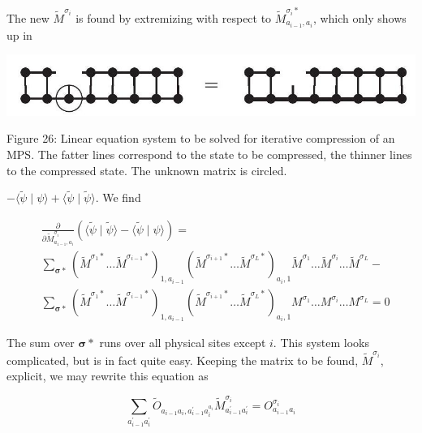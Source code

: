 \documentclass[12pt]{article}
\begin{document}
The new $\tilde{M}^{\sigma_{i}}$ is found by extremizing with respect to $\tilde{M}_{a_{i-1}, a_{i}}^{\sigma_{i} *}$, which only shows up in

\begin{center}
\includegraphics[max width=\textwidth]{2024_05_04_afc4ad226da9ccfe0ac8g-047}
\end{center}

Figure 26: Linear equation system to be solved for iterative compression of an MPS. The fatter lines correspond to the state to be compressed, the thinner lines to the compressed state. The unknown matrix is circled.

$-\langle\tilde{\psi} \mid \psi\rangle+\langle\tilde{\psi} \mid \tilde{\psi}\rangle$. We find

$$
\begin{aligned}
& \frac{\partial}{\partial \tilde{M}_{a_{1-1}, a_{i}}^{\sigma_{i}}}(\langle\tilde{\psi} \mid \tilde{\psi}\rangle-\langle\tilde{\psi} \mid \psi\rangle)= \\
& \sum_{\boldsymbol{\sigma} *}\left(\tilde{M}^{\sigma_{1} *} \ldots \tilde{M}^{\sigma_{i-1} *}\right)_{1, a_{i-1}}\left(\tilde{M}^{\sigma_{i+1} *} \ldots \tilde{M}^{\sigma_{L} *}\right)_{a_{i}, 1} \tilde{M}^{\sigma_{1}} \ldots \tilde{M}^{\sigma_{i}} \ldots \tilde{M}^{\sigma_{L}}- \\
& \sum_{\boldsymbol{\sigma} *}\left(\tilde{M}^{\sigma_{1} *} \ldots \tilde{M}^{\sigma_{i-1} *}\right)_{1, a_{i-1}}\left(\tilde{M}^{\sigma_{i+1} *} \ldots \tilde{M}^{\sigma_{L} *}\right)_{a_{i}, 1} M^{\sigma_{1}} \ldots M^{\sigma_{i}} \ldots M^{\sigma_{L}}=0
\end{aligned}
$$

The sum over $\boldsymbol{\sigma} *$ runs over all physical sites except $i$. This system looks complicated, but is in fact quite easy. Keeping the matrix to be found, $\tilde{M}^{\sigma_{i}}$, explicit, we may rewrite this equation as


\begin{equation*}
\sum_{a_{i-1}^{\prime} a_{i}^{\prime}} \tilde{O}_{a_{i-1} a_{i}, a_{i-1}^{\prime} a_{i}^{a_{i}}} \tilde{M}_{a_{i-1}^{\prime} a_{i}^{\prime}}^{\sigma_{i}}=O_{a_{i-1} a_{i}}^{\sigma_{i}} \tag{143}
\end{equation*}
\end{document}
